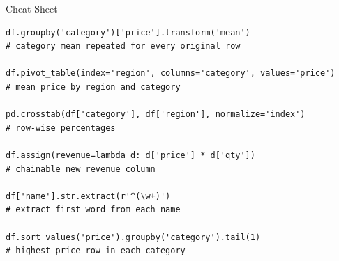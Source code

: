 \documentclass[11pt,aspectratio=43]{beamer}
\begin{document}
\begin{frame}[fragile]{Cheat Sheet}
  \begin{lstlisting}
df.groupby('category')['price'].transform('mean')
# category mean repeated for every original row

df.pivot_table(index='region', columns='category', values='price')
# mean price by region and category

pd.crosstab(df['category'], df['region'], normalize='index')
# row-wise percentages

df.assign(revenue=lambda d: d['price'] * d['qty'])
# chainable new revenue column

df['name'].str.extract(r'^(\w+)')
# extract first word from each name

df.sort_values('price').groupby('category').tail(1)
# highest-price row in each category
  \end{lstlisting}
\end{frame}
\end{document}
